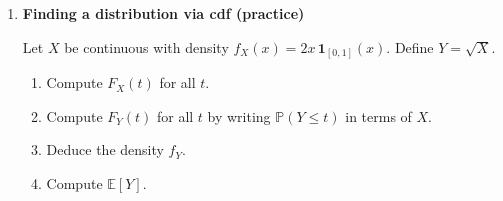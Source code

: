 \documentclass[11pt]{article}
\begin{document}
\begin{enumerate}[leftmargin=*, itemsep=1.2em]
\item \textbf{Finding a distribution via cdf (practice)}

Let $X$ be continuous with density $f_X(x)=2x\,\mathbf{1}_{[0,1]}(x)$.
Define $Y=\sqrt{X}$.
\begin{enumerate}[label=(\alph*)]
\item Compute $F_X(t)$ for all $t$.
\item Compute $F_Y(t)$ for all $t$ by writing $\mathbb{P}(Y\le t)$ in terms of $X$.
\item Deduce the density $f_Y$.
\item Compute $\mathbb{E}[Y]$.
\end{enumerate}

\end{enumerate}
\end{document}
